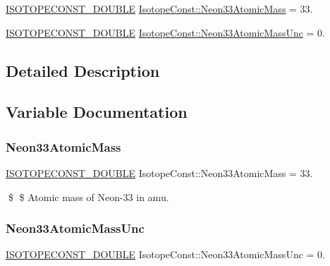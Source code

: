 \begin{DoxyCompactItemize}
\item 
\mbox{\hyperlink{group___isotope_const-_macros_ga8f45a7272ce02c0b4c65c44636ed719a}{I\+S\+O\+T\+O\+P\+E\+C\+O\+N\+S\+T\+\_\+\+D\+O\+U\+B\+LE}} \mbox{\hyperlink{group___isotope_const-_neon-_ne33_ga2cf9ab8f96d66cddc26e80f02de7345d}{Isotope\+Const\+::\+Neon33\+Atomic\+Mass}} = 33.
\item 
\mbox{\hyperlink{group___isotope_const-_macros_ga8f45a7272ce02c0b4c65c44636ed719a}{I\+S\+O\+T\+O\+P\+E\+C\+O\+N\+S\+T\+\_\+\+D\+O\+U\+B\+LE}} \mbox{\hyperlink{group___isotope_const-_neon-_ne33_ga3f4ec37a87d78b39dd81ccede7970a93}{Isotope\+Const\+::\+Neon33\+Atomic\+Mass\+Unc}} = 0.
\end{DoxyCompactItemize}


\subsection{Detailed Description}


\subsection{Variable Documentation}
\mbox{\label{group___isotope_const-_neon-_ne33_ga2cf9ab8f96d66cddc26e80f02de7345d}} 
\subsubsection{\texorpdfstring{Neon33\+Atomic\+Mass}{Neon33AtomicMass}}
{\footnotesize\ttfamily \mbox{\hyperlink{group___isotope_const-_macros_ga8f45a7272ce02c0b4c65c44636ed719a}{I\+S\+O\+T\+O\+P\+E\+C\+O\+N\+S\+T\+\_\+\+D\+O\+U\+B\+LE}} Isotope\+Const\+::\+Neon33\+Atomic\+Mass = 33.}

\$ \$ Atomic mass of Neon-\/33 in amu. \mbox{\label{group___isotope_const-_neon-_ne33_ga3f4ec37a87d78b39dd81ccede7970a93}} 
\subsubsection{\texorpdfstring{Neon33\+Atomic\+Mass\+Unc}{Neon33AtomicMassUnc}}
{\footnotesize\ttfamily \mbox{\hyperlink{group___isotope_const-_macros_ga8f45a7272ce02c0b4c65c44636ed719a}{I\+S\+O\+T\+O\+P\+E\+C\+O\+N\+S\+T\+\_\+\+D\+O\+U\+B\+LE}} Isotope\+Const\+::\+Neon33\+Atomic\+Mass\+Unc = 0.}

